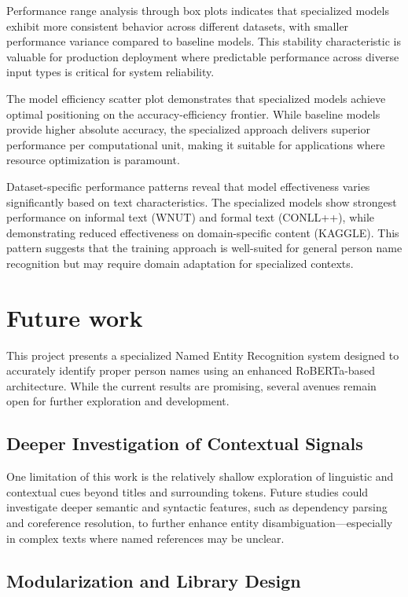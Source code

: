 \documentclass[a4paper]{usiinfbachelorproject}
\begin{document}
Performance range analysis through box plots indicates that specialized models exhibit more consistent behavior across different datasets, with smaller performance variance compared to baseline models. This stability characteristic is valuable for production deployment where predictable performance across diverse input types is critical for system reliability.

The model efficiency scatter plot demonstrates that specialized models achieve optimal positioning on the accuracy-efficiency frontier. While baseline models provide higher absolute accuracy, the specialized approach delivers superior performance per computational unit, making it suitable for applications where resource optimization is paramount.

Dataset-specific performance patterns reveal that model effectiveness varies significantly based on text characteristics. The specialized models show strongest performance on informal text (WNUT) and formal text (CONLL++), while demonstrating reduced effectiveness on domain-specific content (KAGGLE). This pattern suggests that the training approach is well-suited for general person name recognition but may require domain adaptation for specialized contexts.

\newpage
\section{\textbf{Future work}}

This project presents a specialized Named Entity Recognition system designed to accurately identify proper person names using an enhanced RoBERTa-based architecture. While the current results are promising, several avenues remain open for further exploration and development.

\subsection{Deeper Investigation of Contextual Signals}

One limitation of this work is the relatively shallow exploration of linguistic and contextual cues beyond titles and surrounding tokens. Future studies could investigate deeper semantic and syntactic features, such as dependency parsing and coreference resolution, to further enhance entity disambiguation—especially in complex texts where named references may be unclear.

\subsection{Modularization and Library Design}
\end{document}
